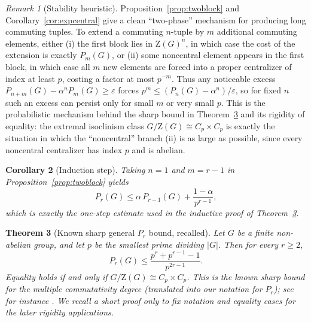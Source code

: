 \documentclass[11pt]{article}
\newtheorem{theorem}{Theorem}[section]
\newtheorem{corollary}[theorem]{Corollary}
\theoremstyle{definition}
\theoremstyle{remark}
\newtheorem{remark}[theorem]{Remark}
\theoremstyle{definition}
\theoremstyle{plain}
\newcommand{\Z}{\mathrm{Z}}
\begin{document}
\begin{remark}[Stability heuristic]\label{rem:stability-heuristic}
Proposition~\ref{prop:twoblock} and Corollary~\ref{cor:expcentral} give a clean ``two-phase'' mechanism
for producing long commuting tuples.
To extend a commuting $n$-tuple by $m$ additional commuting elements, either
(i) the first block lies in $\Z(G)^n$, in which case the cost of the extension is exactly $P_m(G)$, or
(ii) some noncentral element appears in the first block, in which case all $m$ new elements are forced into
a proper centralizer of index at least $p$, costing a factor at most $p^{-m}$.
Thus any noticeable excess
\(
P_{n+m}(G)-\alpha^{n}P_m(G)\ge \varepsilon
\)
forces
\(
p^{m}\le (P_n(G)-\alpha^{n})/\varepsilon
\),
so for fixed $n$ such an excess can persist only for small $m$ or very small $p$.
This is the probabilistic mechanism behind the sharp bound in Theorem~\ref{thm:Prbound} and its rigidity of equality:
the extremal isoclinism class $G/\Z(G)\cong C_p\times C_p$ is exactly the situation in which the ``noncentral''
branch (ii) is as large as possible, since every noncentral centralizer has index $p$ and is abelian.
\end{remark}

\begin{corollary}[Induction step]\label{cor:induction-step}
Taking $n=1$ and $m=r-1$ in Proposition~\ref{prop:twoblock} yields
\[
P_r(G)\le \alpha\,P_{r-1}(G)+\frac{1-\alpha}{p^{r-1}},
\]
which is exactly the one-step estimate used in the inductive proof of Theorem~\ref{thm:Prbound}.
\end{corollary}

\begin{theorem}[Known sharp general $P_r$ bound, recalled]\label{thm:Prbound}
Let $G$ be a finite non-abelian group, and let $p$ be the smallest prime dividing $|G|$.
Then for every $r\ge 2$,
\[
P_r(G)\le \frac{p^r+p^{r-1}-1}{p^{2r-1}}.
\]
Equality holds if and only if $G/\Z(G)\cong C_p\times C_p$.
This is the known sharp bound for the multiple commutativity degree (translated into our notation for $P_r$);
see for instance \cite[Prop.~2.4]{RezaeiNiroomandErfanian2014}. We recall a short proof only to fix notation and equality cases for the later rigidity applications.
\end{theorem}
\end{document}
